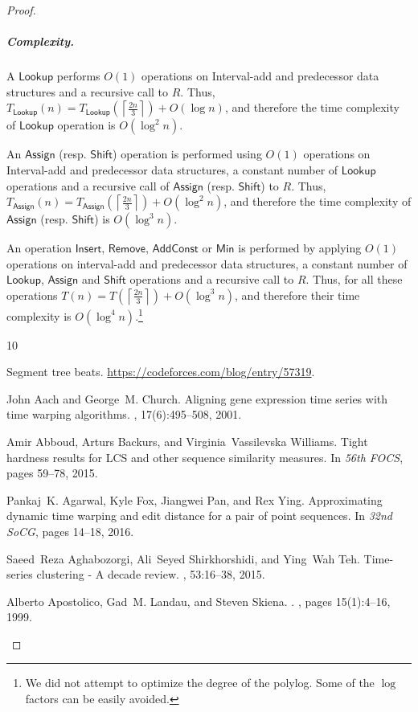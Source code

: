 \documentclass[a4paper,UKenglish,cleveref, autoref, thm-restate]{lipics-v2021}
\newcommand{\AssignOp}{\mathsf{Assign}}
\newcommand{\ShiftOp}{\mathsf{Shift}}
\newcommand{\Insert}{\mathsf{Insert}}
\newcommand{\Remove}{\mathsf{Remove}}
\newcommand{\Lookup}{\mathsf{Lookup}}
\newcommand{\Add}{\mathsf{AddConst}}
\newcommand{\Min}{\mathsf{Min}}
\newcommand{\para}[1]{\vspace{-0.1in} \subparagraph*{#1}}
\newcommand{\ceil}[1]{\left\lceil{#1}\right\rceil}
\begin{document}
\begin{proof}
\para{Complexity.}
A $\Lookup$ performs $O(1)$ operations on Interval-add and predecessor data structures and a recursive call to $R$. 
Thus, $T_{\Lookup}(n)=T_{\Lookup}(\ceil{\frac{2n}{3}})+O(\log n)$, and therefore the time complexity of $\Lookup$ operation is $O(\log^2 n)$.

An $\AssignOp$ (resp. $\ShiftOp$) operation is performed using $O(1)$ operations on Interval-add and predecessor data structures, a constant number of $\Lookup$ operations and a recursive call of $\AssignOp$ (resp. $\ShiftOp$) to $R$. 
Thus, $T_{\AssignOp}(n) =T_{\AssignOp}(\ceil{\frac{2n}{3}})+O(\log^2 n)$, and therefore the time complexity of $\AssignOp$ (resp. $\ShiftOp$) is $O(\log^3 n)$.

An operation $\Insert$, $\Remove$, $\Add$ or $\Min$ is performed by applying $O(1)$ operations on interval-add and predecessor data structures, a constant number of $\Lookup$, $\AssignOp$ and $\ShiftOp$ operations and a recursive call to $R$. 
Thus, for all these operations $T(n)=T(\ceil{\frac{2n}{3}})+O(\log^3 n)$, and therefore their time complexity is $O(\log^4 n)$.\footnote{We did not attempt to optimize the degree of the polylog. Some of the $\log$ factors can be easily avoided.}

\begin{thebibliography}{10}

Segment tree beats.
\newblock \url{https://codeforces.com/blog/entry/57319}.

John Aach and George~M. Church.
\newblock Aligning gene expression time series with time warping algorithms.
, 17(6):495--508, 2001.

Amir Abboud, Arturs Backurs, and Virginia~Vassilevska Williams.
\newblock Tight hardness results for {LCS} and other sequence similarity
  measures.
\newblock In {\em 56th {FOCS}}, pages 59--78, 2015.

Pankaj~K. Agarwal, Kyle Fox, Jiangwei Pan, and Rex Ying.
\newblock Approximating dynamic time warping and edit distance for a pair of
  point sequences.
\newblock In {\em 32nd {S}o{CG}}, pages 14--18, 2016.

Saeed~Reza Aghabozorgi, Ali~Seyed Shirkhorshidi, and Ying~Wah Teh.
\newblock Time-series clustering - {A} decade review.
, 53:16--38, 2015.

Alberto Apostolico, Gad~M. Landau, and Steven Skiena.
.
, pages 15(1):4--16, 1999.


\end{thebibliography}
\end{proof}
\end{document}
